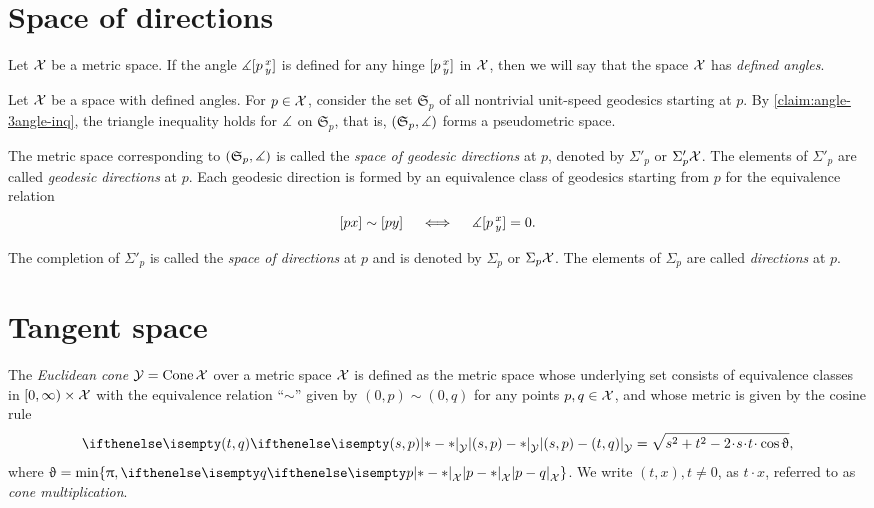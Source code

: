 \section{Space of directions} 
\label{sec:tangent-space+directions}

Let $\mathcal{X}$ be a metric space.
If the angle $\measuredangle[p\,{}^{x}_{y}]$ is defined for any hinge $[p\,{}^{x}_{y}]$ in $\mathcal{X}$,
then we will say that the space $\mathcal{X}$ has \emph{defined angles}.

 
Let $\mathcal{X}$ be a space with defined angles. For $p\in \spc{X}$,
consider the set $\mathfrak{S}_p$ 
of all nontrivial unit-speed geodesics starting at $p$.
By \ref{claim:angle-3angle-inq}, the triangle inequality holds for $\measuredangle$ on $\mathfrak{S}_p$,
that is, $(\mathfrak{S}_p,\measuredangle)$ 
forms a pseudometric space.

The metric space corresponding to  $(\mathfrak{S}_p,\measuredangle)$ is called the \emph{space of geodesic directions} at $p$, denoted by $\Sigma'_p$ or $\Sigma'_p\mathcal{X}$.
The elements of $\Sigma'_p$ are called \emph{geodesic directions} at $p$.
Each geodesic direction is formed by an equivalence class of geodesics starting from $p$ 
for the equivalence relation 
\[[px]\sim[py]\quad \iff\quad \measuredangle[p\,{}^{x}_{y}]=0.\]



The completion of $\Sigma'_p$ is called the \emph{space of directions} at $p$ and is denoted by $\Sigma_p$ or $\Sigma_p\mathcal{X}$.
The elements of $\Sigma_p$ are called \emph{directions} at $p$.

\section{Tangent space}\label{sec: tangent space}

The \emph{
Euclidean cone} $\mathcal{Y}=\mathop{\rm Cone}\nolimits\mathcal{X}$ 
over a metric space $\mathcal{X}$
is defined as the metric space whose underlying set consists of
equivalence classes in
$[0,\infty)\times \spc{X}$ with the equivalence relation ``$\sim$'' given by $(0,p)\sim (0,q)$ for any points $p,q\in\spc{X}$,
and whose metric is given by the cosine rule
\[
\dist{(s,p)}{(t,q)}{\spc{Y}} 
=
\sqrt{s^2+t^2-2\cdot s\cdot t\cdot \cos\theta},
\]
where $\theta= \min\{\pi, \dist{p}{q}{\spc{X}}\}$.
We write $(t,x), t \ne 0$, as $t\cdot x$, referred to as \emph{cone multiplication}.

